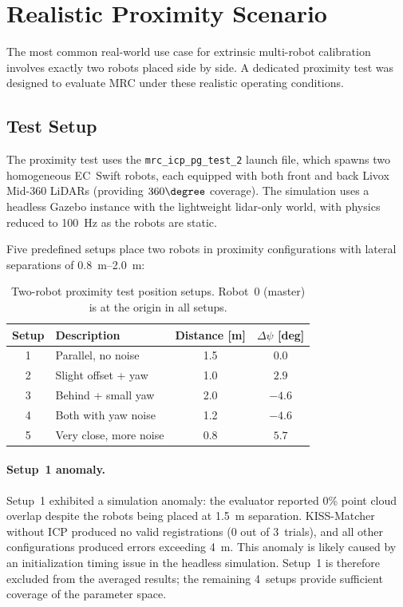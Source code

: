 \section{Realistic Proximity Scenario}
\label{sec:proximity_test}

The most common real-world use case for extrinsic multi-robot
calibration involves exactly two robots placed side by side.
A dedicated proximity test was designed to evaluate MRC under
these realistic operating conditions.

\subsection{Test Setup}

The proximity test uses the \texttt{mrc\_icp\_pg\_test\_2} launch
file, which spawns two homogeneous EC~Swift robots, each equipped
with both front and back Livox Mid-360 LiDARs (providing
$360\degree$ coverage).
The simulation uses a headless Gazebo instance with the lightweight
lidar-only world, with physics reduced to \SI{100}{\hertz} as the
robots are static.

Five predefined setups place two robots in proximity configurations
with lateral separations of \SIrange{0.8}{2.0}{\metre}:

\begin{table}[htbp]
    \centering
    \caption{Two-robot proximity test position setups.
             Robot~0 (master) is at the origin in all setups.}
    \label{tab:proximity_setups}
    \small
    \begin{tabular}{c l c c}
        \toprule
        \textbf{Setup}
            & \textbf{Description}
            & \textbf{Distance} [m]
            & $\Delta\psi$ [deg] \\
        \midrule
        1 & Parallel, no noise     & 1.5  & $0.0$ \\
        2 & Slight offset + yaw    & 1.0  & $2.9$ \\
        3 & Behind + small yaw     & 2.0  & $-4.6$ \\
        4 & Both with yaw noise    & 1.2  & $-4.6$ \\
        5 & Very close, more noise & 0.8  & $5.7$ \\
        \bottomrule
    \end{tabular}
\end{table}

\paragraph{Setup~1 anomaly.}
Setup~1 exhibited a simulation anomaly: the evaluator reported
0\% point cloud overlap despite the robots being placed at
\SI{1.5}{\metre} separation.
KISS-Matcher without ICP produced no valid registrations (0 out
of 3~trials), and all other configurations produced errors exceeding
\SI{4}{\metre}.
This anomaly is likely caused by an initialization timing issue
in the headless simulation.
Setup~1 is therefore excluded from the averaged results; the
remaining 4~setups provide sufficient coverage of the parameter
space.

